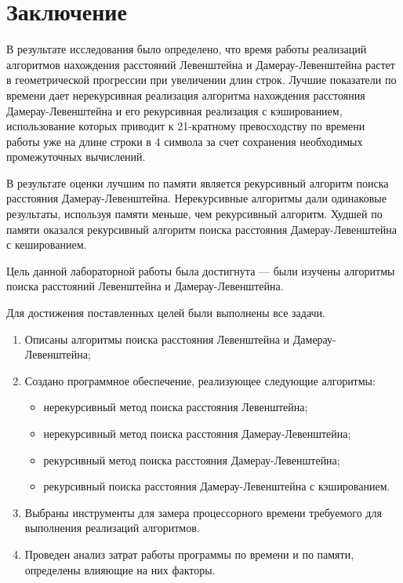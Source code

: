 \chapter*{Заключение}

В результате исследования было определено, что время работы реализаций алгоритмов нахождения расстояний Левенштейна и Дамерау-Левенштейна растет в геометрической прогрессии при увеличении длин строк.
Лучшие показатели по времени дает нерекурсивная реализация алгоритма нахождения расстояния Дамерау-Левенштейна и его рекурсивная реализация с кэшированием, использование которых приводит к 21-кратному превосходству по времени работы уже на длине строки в 4 символа за счет сохранения необходимых промежуточных вычислений.

В результате оценки лучшим по памяти является рекурсивный алгоритм поиска расстояния Дамерау-Левенштейна.
Нерекурсивные алгоритмы дали одинаковые результаты, используя памяти меньше, чем рекурсивный алгоритм.
Худшей по памяти оказался рекурсивный алгоритм поиска расстояния Дамерау-Левенштейна с кешированием.

Цель данной лабораторной работы была достигнута --- были изучены алгоритмы поиска расстояний Левенштейна и Дамерау-Левенштейна.

Для достижения поставленных целей были выполнены все задачи.
\begin{enumerate}[label={\arabic*)}]
	\item Описаны алгоритмы поиска расстояния Левенштейна и \newline Дамерау-Левенштейна;
	\item Создано программное обеспечение, реализующее следующие алгоритмы:
	\begin{itemize}[label=---]
		\item нерекурсивный метод поиска расстояния Левенштейна;
		\item нерекурсивный метод поиска расстояния Дамерау-Левенштейна;
		\item рекурсивный метод поиска расстояния Дамерау-Левенштейна;
		\item рекурсивный поиска расстояния Дамерау-Левенштейна с кэшированием.
	\end{itemize}
	\item Выбраны инструменты для замера процессорного времени требуемого для выполнения реализаций алгоритмов.
	\item Проведен анализ затрат работы программы по времени и по памяти, определены влияющие на них факторы.
\end{enumerate}
